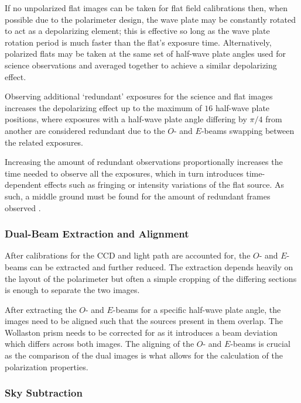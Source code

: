 If no unpolarized flat images can be taken for flat field calibrations then, when possible due to the polarimeter design, the wave plate may be constantly rotated to act as a depolarizing element; this is effective so long as the wave plate rotation period is much faster than the flat's exposure time.
Alternatively, polarized flats may be taken at the same set of half-wave plate angles used for science observations and averaged together to achieve a similar depolarizing effect.

Observing additional `redundant' exposures for the science and flat images increases the depolarizing effect up to the maximum of $16$ half-wave plate positions, where exposures with a half-wave plate angle differing by $\pi / 4$ from another are considered redundant due to the $O$- and $E$-beams swapping between the related exposures.

Increasing the amount of redundant observations proportionally increases the time needed to observe all the exposures, which in turn introduces time-dependent effects such as fringing or intensity variations of the flat source.
As such, a middle ground must be found for the amount of redundant frames observed \citep{polarimetry_error, pol_optimize}.

\subsubsection{Dual-Beam Extraction and Alignment} \label{subsubsec:pol_oe_extract}

After calibrations for the \gls{CCD} and light path are accounted for, the $O$- and $E$-beams can be extracted and further reduced.
The extraction depends heavily on the layout of the polarimeter but often a simple cropping of the differing sections is enough to separate the two images.

After extracting the $O$- and $E$-beams for a specific half-wave plate angle, the images need to be aligned such that the sources present in them overlap.
The Wollaston prism needs to be corrected for as it introduces a beam deviation which differs across both images.
The aligning of the $O$- and $E$-beams is crucial as the comparison of the dual images is what allows for the calculation of the polarization properties.

\subsubsection{Sky Subtraction} \label{subsubsec:pol_sky_subtract}

